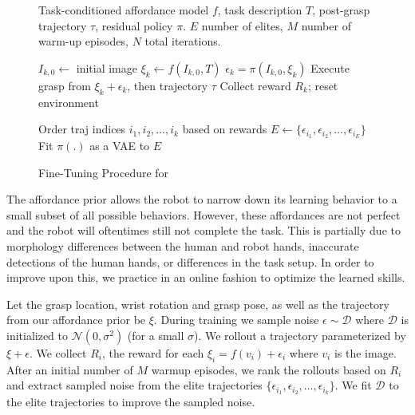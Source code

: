 \begin{figure}
\vspace{-0.3in}
\begin{minipage}{\linewidth}
\begin{algorithm}[H]
\caption{\small Fine-Tuning Procedure for \ours}\label{alg:cap}
\begin{algorithmic}
\small
\REQUIRE Task-conditioned affordance model $f$, task description $T$, post-grasp trajectory $\tau$, residual policy $\pi$. $E$ number of elites, $M$ number of warm-up episodes, $N$ total iterations. 

    \STATE $I_{k, 0} \gets $ initial image
    \STATE $\xi_k \gets f(I_{k, 0}, T)$
    \STATE $\epsilon_k = \pi(I_{k, 0}, \xi_k)$
    \STATE Execute grasp from $\xi_k + \epsilon_k$, then trajectory $\tau$
    \STATE Collect reward $R_k$; reset environment

        \STATE Order traj indices $i_1, i_2, \dots, i_k$ based on rewards
        \STATE $E \gets \{ \epsilon_{i_1}, \epsilon_{i_2}, \dots, \epsilon_{i_E} \} $
        \STATE Fit $\pi(.)$ as a VAE to $E$
    \ENDIF
\ENDFOR

\end{algorithmic}
\label{algo:finetune}

\end{algorithm}
\end{minipage}
\end{figure}


The affordance prior allows the robot to narrow down its learning behavior to a small subset of all possible behaviors. However, these affordances are not perfect and the robot will oftentimes still not complete the task.  This is partially due to morphology differences between the human and robot hands, inaccurate detections of the human hands, or differences in the task setup. In order to improve upon this, we practice in an online fashion to optimize the learned skills. 

Let the grasp location, wrist rotation and grasp pose, as well as the trajectory from our affordance prior be $\xi$. During training we sample noise $\epsilon \sim \mathcal{D}$ where $\mathcal{D}$ is initialized to $\mathcal{N}(0, \sigma^2)$ (for a small $\sigma$). We rollout a trajectory parameterized by $\xi + \epsilon$. We collect $R_i$, the reward for each $\xi_i = f(v_i) + \epsilon_i$ where $v_i$ is the image.  After an initial number of $M$ warmup episodes, we rank the rollouts based on $R_i$ and extract sampled noise from the elite trajectories $\{ \epsilon_{i_1}, \epsilon_{i_2}, \dots, \epsilon_{i_k} \}$. We fit $\mathcal{D}$ to the elite trajectories to improve the sampled noise. 

